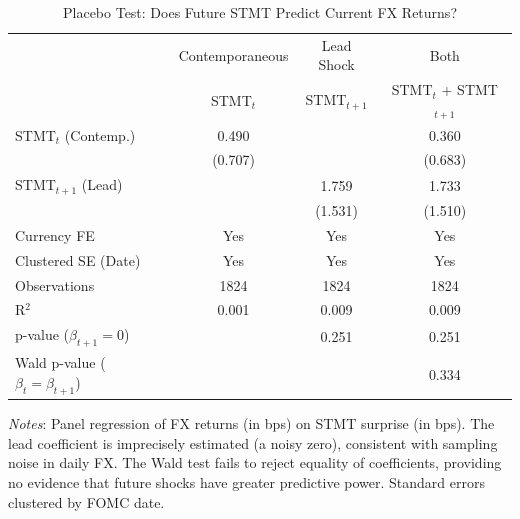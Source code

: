 \begin{table}[htbp]
\centering
\caption{Placebo Test: Does Future STMT Predict Current FX Returns?}
\label{tab:placebo}
\begin{tabular}{lccc}
\hline\hline
 & Contemporaneous & Lead Shock & Both \\
 & STMT$_t$ & STMT$_{t+1}$ & STMT$_t$ + STMT$_{t+1}$ \\
\hline
STMT$_t$ (Contemp.) & 0.490 & & 0.360 \\
 & (0.707) & & (0.683) \\[0.3em]
STMT$_{t+1}$ (Lead) & & 1.759 & 1.733 \\
 & & (1.531) & (1.510) \\[0.3em]
\hline
Currency FE & Yes & Yes & Yes \\
Clustered SE (Date) & Yes & Yes & Yes \\
Observations & 1824 & 1824 & 1824 \\
R$^2$ & 0.001 & 0.009 & 0.009 \\
\hline
p-value ($\beta_{t+1} = 0$) & & 0.251 & 0.251 \\
Wald p-value ($\beta_t = \beta_{t+1}$) & & & 0.334 \\
\hline\hline
\end{tabular}

\vspace{0.3em}
\footnotesize \textit{Notes}: Panel regression of FX returns (in bps) on STMT surprise (in bps). The lead coefficient is imprecisely estimated (a noisy zero), consistent with sampling noise in daily FX. The Wald test fails to reject equality of coefficients, providing no evidence that future shocks have greater predictive power. Standard errors clustered by FOMC date.
\end{table}
